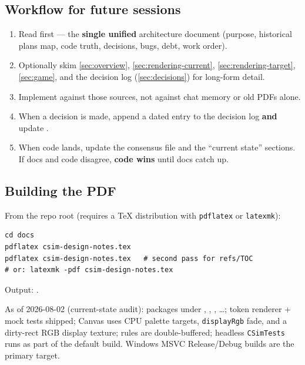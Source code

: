 \subsection{Workflow for future sessions}
\begin{enumerate}
  \item Read  first --- the
        \textbf{single unified} architecture document (purpose, historical
        plans map, code truth, decisions, bugs, debt, work order).
  \item Optionally skim \cref{sec:overview}, \cref{sec:rendering-current},
        \cref{sec:rendering-target}, \cref{sec:game}, and the decision log
        (\cref{sec:decisions}) for long-form detail.
  \item Implement against those sources, not against chat memory or old PDFs alone.
  \item When a decision is made, append a dated entry to the decision log
        \textbf{and} update .
  \item When code lands, update the consensus file and the ``current state''
        sections. If docs and code disagree, \textbf{code wins} until docs catch up.
\end{enumerate}

\subsection{Building the PDF}
From the repo root (requires a TeX distribution with \texttt{pdflatex} or
\texttt{latexmk}):
\begin{lstlisting}[language={}]
cd docs
pdflatex csim-design-notes.tex
pdflatex csim-design-notes.tex   # second pass for refs/TOC
# or: latexmk -pdf csim-design-notes.tex
\end{lstlisting}

\noindent Output: .

\begin{statusbox}
As of 2026-08-02 (current-state audit): packages under ,
, , \ldots; token renderer + mock tests shipped;
Canvas uses CPU palette targets, \texttt{displayRgb} fade, and a dirty-rect RGB
display texture; rules are double-buffered; headless \texttt{CSimTests} runs
as part of the default build. Windows MSVC Release/Debug builds are the primary
target.
\end{statusbox}
